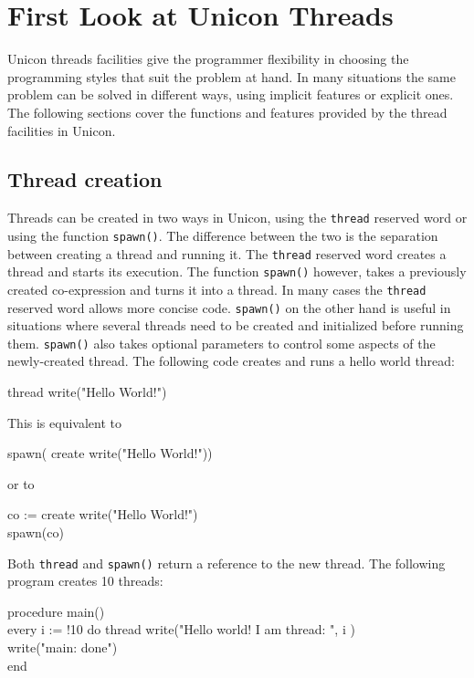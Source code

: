 \section{First Look at Unicon Threads}

Unicon threads facilities give the programmer flexibility in choosing
the programming styles that suit the problem at hand. In many
situations the same problem can be solved in different ways, using
implicit features or explicit ones. The following sections cover the
functions and features provided by the thread facilities in Unicon.

\subsection*{Thread creation}

Threads can be created in two ways in Unicon, using the
\texttt{thread} reserved word or using the function
\texttt{spawn()}. The difference between the two is the separation
between creating a thread and running it. The \texttt{thread} reserved
word creates a thread and starts its execution. The function
\texttt{spawn()} however, takes a previously created co-expression and
turns it into a thread.  In many cases the \texttt{thread} reserved
word allows more concise code. \texttt{spawn()} on the other hand is
useful in situations where several threads need to be created and
initialized before running them.  \texttt{spawn()} also takes optional
parameters to control some aspects of the newly-created thread. The
following code creates and runs a hello world thread:

\begin{icode}
thread write("Hello World!")
\end{icode}

\noindent This is equivalent to
\begin{icode}
spawn( create write("Hello World!"))
\end{icode}
or to
\begin{icode}
co := create write("Hello World!") \\
spawn(co)
\end{icode}
Both \texttt{thread} and \texttt{spawn()} return a reference to the
new thread. The following program creates 10 threads: 
\begin{icode}
procedure main() \\
\> every i := !10 do thread write("Hello world! I am thread: ", i ) \\
\> write("main: done") \\
end
\end{icode}

